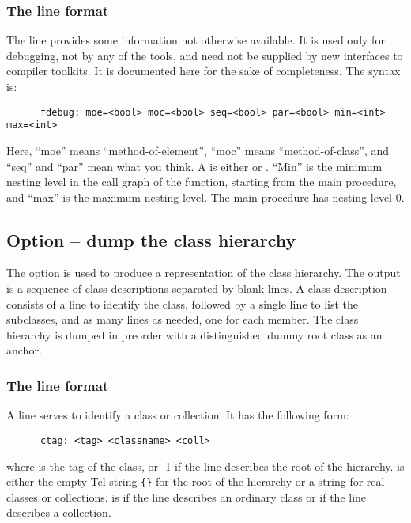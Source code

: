 \subsubsection{The  line format}

The  line provides some information not otherwise available.
It is used only for debugging, not by any of the tools, and need not be
supplied by new interfaces to compiler toolkits. It is documented here
for the sake of completeness. The syntax is:
\begin{verbatim}
      fdebug: moe=<bool> moc=<bool> seq=<bool> par=<bool> min=<int> max=<int>
\end{verbatim}
\noindent
Here, ``moe'' means ``method-of-element'', ``moc'' means
``method-of-class'', and ``seq'' and ``par'' mean what you think. A
 is either  or . ``Min'' is the minimum
nesting level in the call graph of the function, starting from the main
procedure, and ``max'' is the maximum nesting level. The main procedure
has nesting level 0.

\subsection{Option  -- dump the class hierarchy}

The  option is used to produce a representation of the class
hierarchy. 
The output is a sequence of class descriptions separated by blank
lines.  A class description consists of a  line to identify
the class, followed by a single  line to list the subclasses,
and as many  lines as needed, one for each member. The class
hierarchy is dumped in preorder with a distinguished dummy root class as
an anchor.

\subsubsection{The  line format}

A  line serves to identify a class or collection. It has the
following form:

\begin{verbatim}
      ctag: <tag> <classname> <coll>
\end{verbatim}

\noindent
where  is the tag of the class, or -1 if the line describes
the root of the hierarchy.  is either the empty Tcl
string \verb+{}+ for the root of the hierarchy or a string for real
classes or collections.  is \code{-} if the line describes
an ordinary class or  if the line describes a collection.

